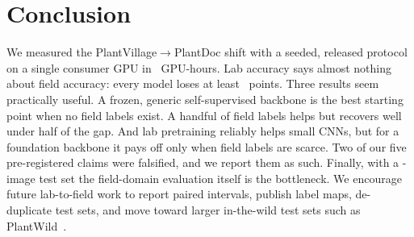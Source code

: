 \section{Conclusion}
\label{sec:conclusion}

We measured the PlantVillage$\rightarrow$PlantDoc shift with a seeded, released protocol on a single consumer GPU in \GPUHours\ GPU-hours.
Lab accuracy says almost nothing about field accuracy: every model loses at least \dinovtwoslpGap\ points.
Three results seem practically useful. A frozen, generic self-supervised backbone is the best starting point when no field labels exist. A handful of field labels helps but recovers well under half of the gap. And lab pretraining reliably helps small CNNs, but for a foundation backbone it pays off only when field labels are scarce.
Two of our five pre-registered claims were falsified, and we report them as such.
Finally, with a \PDtestN-image test set the field-domain evaluation itself is the bottleneck. We encourage future lab-to-field work to report paired intervals, publish label maps, de-duplicate test sets, and move toward larger in-the-wild test sets such as PlantWild~\cite{wei2024benchmarking}.
